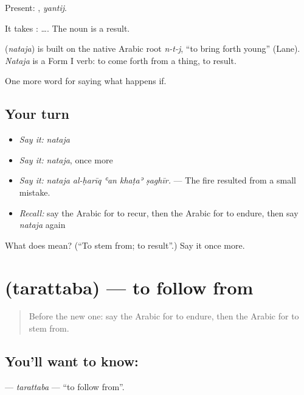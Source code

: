 Present: , \emph{yantij}.

It takes :   …. The noun  is a result.

\begin{cousinweb}
\textbf{} (\emph{nataja}) is built on the native Arabic root \emph{n-t-j}, \textquotedblleft{}to bring forth young\textquotedblright{} (Lane). \emph{Nataja} is a Form I verb: to come forth from a thing, to result.
\end{cousinweb}

\begin{grammarlens}[title={What you've built}]
One more word for saying what happens if.
\end{grammarlens}

\subsection*{Your turn}
\begin{itemize}
\raggedright
  \item \emph{Say it:} \emph{nataja}
  \item \emph{Say it:} \emph{nataja}, once more
  \item \emph{Say it:} \emph{nataja al-ḥarīq ʿan khaṭaʾ ṣaghīr.} — The fire resulted from a small mistake.
  \item \emph{Recall:} say the Arabic for to recur, then the Arabic for to endure, then say \emph{nataja} again
\end{itemize}

\begin{tcolorbox}[breakable,colback=teal!4,colframe=teal!35!black,title={Before you move on}]
What does  mean? (\textquotedblleft{}To stem from; to result\textquotedblright{}.) Say it once more.
\end{tcolorbox}
\section[\texorpdfstring{\ar{ترتب} (tarattaba)}{ترتب (tarattaba)}]{ (tarattaba) — to follow from}

\label{lesson:AR-C414-tarattaba}



\begin{quote}
Before the new one: say the Arabic for to endure, then the Arabic for to stem from.
\end{quote}

\subsection*{You'll want to know: }
\textbf{} — \emph{tarattaba} — \textquotedblleft{}to follow from\textquotedblright{}.

